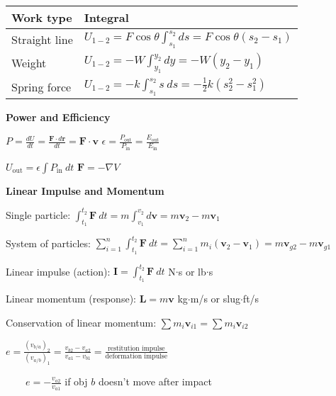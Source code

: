 \documentclass[twocolumn]{article}
\begin{document}
\vspace{-.5em}
\begin{table}[ht]
    \begin{tabular}{l | l}
        \toprule
        Work type & Integral \\
        \midrule
        Straight line & $U_{1-2} = F \cos \theta \int_{s_1}^{s_2} ds = F \cos \theta (s_2 - s_1)$ \\
        \midrule
        Weight & $U_{1-2} = -W \int_{y_1}^{y_2} dy = -W(y_2 - y_1)$ \\
        \midrule
        Spring force & $U_{1-2} = -k \int_{s_1}^{s_2} s\ ds = -\frac{1}{2} k (s_2^2 - s_1^2)$ \\
        \bottomrule
    \end{tabular}
\end{table} \vspace{-.5em}

\vspace{-.5em}
\dotfill

\textbf{Power and Efficiency}

$P = \frac{dU}{dt} = \frac{\mathbf{F} \cdot d\mathbf{r}}{dt} = \mathbf{F} \cdot \mathbf{v}$ \hfill $\epsilon = \frac{P_{\text{out}}}{P_{\text{in}}} = \frac{E_{\text{out}}}{E_{\text{in}}}$

$U_{\text{out}} = \epsilon \int P_{\text{in}}\ dt$ \hfill $\mathbf{F} = -\nabla V$

\dotfill

\textbf{Linear Impulse and Momentum}

Single particle: $\int_{t_1}^{t_2} \mathbf{F}\ dt = m \int_{v_1}^{v_2} d\mathbf{v} = m \mathbf{v}_2 - m \mathbf{v}_1$

System of particles: $\sum_{i=1}^n \int_{t_1}^{t_2} \mathbf{F}\ dt = \sum_{i=1}^n m_i (\mathbf{v}_2 - \mathbf{v}_1) = m \mathbf{v}_{g2} - m \mathbf{v}_{g1}$

Linear impulse (action): $\mathbf{I} = \int_{t_1}^{t_2} \mathbf{F}\ dt$ \hfill N$\cdot$s or lb$\cdot$s

Linear momentum (response): $\mathbf{L} = m\mathbf{v}$ \hfill kg$\cdot$m/s or slug$\cdot$ft/s

Conservation of linear momentum: $\sum m_i \mathbf{v}_{i1} = \sum m_i \mathbf{v}_{i2}$

$e = \frac{(v_{b/a})_2}{(v_{a/b})_1} = \frac{v_{b2} - v_{a2}}{v_{a1} - v_{b1}} = \frac{\text{restitution impulse}}{\text{deformation impulse}}$

$\quad\quad e = -\frac{v_{a2}}{v_{a1}}$ if obj $b$ doesn't move after impact
\end{document}
